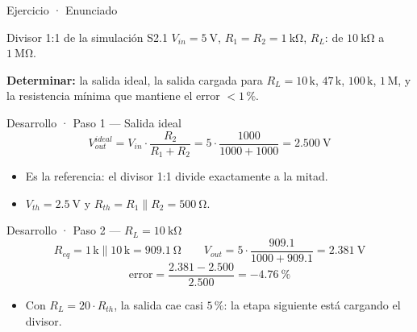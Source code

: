 \documentclass[aspectratio=169]{beamer}
\begin{document}
\begin{frame}{Ejercicio · Enunciado}
  \begin{block}{Divisor 1:1 de la simulación S2.1}
    \centering
    $V_{in} = \SI{5}{\volt}$, \quad $R_1 = R_2 = \SI{1}{\kilo\ohm}$, \quad $R_L$: de $\SI{10}{\kilo\ohm}$ a $\SI{1}{\mega\ohm}$.
  \end{block}
  \begin{center}
  \end{center}
  \textbf{Determinar:} la salida ideal, la salida cargada para $R_L = 10\,\text{k}$, $47\,\text{k}$, $100\,\text{k}$, $1\,\text{M}$,
  y la resistencia mínima que mantiene el error $<1\,\text{\%}$.
\end{frame}

\begin{frame}{Desarrollo · Paso 1 — Salida ideal}
  \[
    V_{out}^{ideal} = V_{in}\cdot\frac{R_2}{R_1+R_2}
    = 5\cdot\frac{1000}{1000+1000} = \SI{2.500}{\volt}
  \]
  \pause
  \begin{itemize}
    \item Es la referencia: el divisor 1:1 divide exactamente a la mitad.
    \item $V_{th} = \SI{2.5}{\volt}$ y $R_{th} = R_1\parallel R_2 = \SI{500}{\ohm}$.
  \end{itemize}
\end{frame}

\begin{frame}{Desarrollo · Paso 2 — $R_L = \SI{10}{\kilo\ohm}$}
  \[
    R_{eq} = 1\,\text{k}\parallel 10\,\text{k} = \SI{909.1}{\ohm}
    \qquad
    V_{out} = 5\cdot\frac{909.1}{1000+909.1} = \SI{2.381}{\volt}
  \]
  \[
    \text{error} = \frac{2.381-2.500}{2.500} = \SI{-4.76}{\percent}
  \]
  \pause
  \begin{itemize}
    \item Con $R_L = 20\cdot R_{th}$, la salida cae casi $5\,\text{\%}$: la etapa siguiente está cargando el divisor.
  \end{itemize}
\end{frame}
\end{document}
